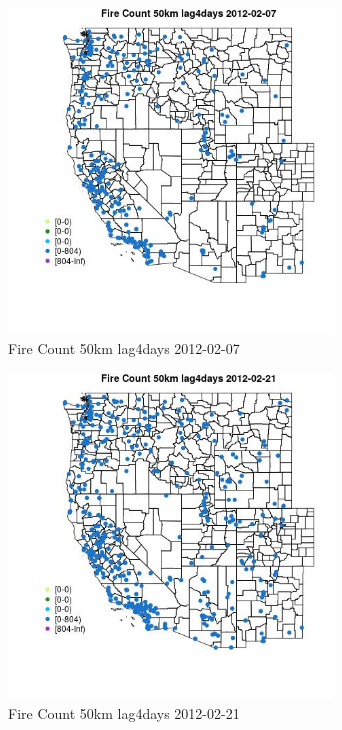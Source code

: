 \begin{figure} 
\centering  
\includegraphics[width=0.77\textwidth]{Code_Outputs/Report_ML_input_PM25_Step4_part_f_de_duplicated_aves_prioritize_24hr_obswNAs_MapObsFire_Count_50km_lag4days2012-02-07.jpg} 
\caption{\label{fig:Report_ML_input_PM25_Step4_part_f_de_duplicated_aves_prioritize_24hr_obswNAsMapObsFire_Count_50km_lag4days2012-02-07}Fire Count 50km lag4days 2012-02-07} 
\end{figure} 
 

\clearpage 

\begin{figure} 
\centering  
\includegraphics[width=0.77\textwidth]{Code_Outputs/Report_ML_input_PM25_Step4_part_f_de_duplicated_aves_prioritize_24hr_obswNAs_MapObsFire_Count_50km_lag4days2012-02-21.jpg} 
\caption{\label{fig:Report_ML_input_PM25_Step4_part_f_de_duplicated_aves_prioritize_24hr_obswNAsMapObsFire_Count_50km_lag4days2012-02-21}Fire Count 50km lag4days 2012-02-21} 
\end{figure} 
 

